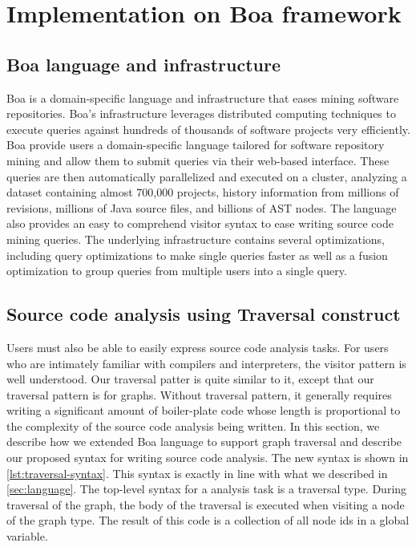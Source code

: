 \chapter{Implementation on Boa framework}
\label{sec:impl}

\section{Boa language and infrastructure}
Boa is a domain-specific language and infrastructure that eases mining software repositories. Boa's infrastructure leverages distributed computing techniques to execute queries against hundreds of thousands of software projects very efficiently. Boa provide users a
domain-specific language tailored for software repository mining and allow them to submit queries via
their web-based interface. These queries are then automatically parallelized and executed on a cluster,
analyzing a dataset containing almost 700,000 projects, history information from millions of revisions,
millions of Java source files, and billions of AST nodes. The language also provides an easy to comprehend
visitor syntax to ease writing source code mining queries. The underlying infrastructure contains
several optimizations, including query optimizations to make single queries faster as well as a fusion
optimization to group queries from multiple users into a single query. 

\section{Source code analysis using Traversal construct}
Users must also be able to easily express source code analysis tasks. For users who are intimately
familiar with compilers and interpreters, the visitor pattern is well understood. Our traversal patter is quite similar to it, except that our traversal pattern is for graphs. Without traversal pattern, it generally requires writing a
significant amount of boiler-plate code whose length is proportional to the complexity of the source code analysis being written.
In this section, we describe how we extended Boa language to support graph traversal and describe our proposed syntax for writing source code analysis. 
The new syntax is shown in \ref{lst:traversal-syntax}. This syntax is exactly in line with what we described in \ref{sec:language}. The top-level syntax for a analysis task is a traversal type. During traversal of the graph, the body of the traversal is executed when visiting a node of the graph type. The result of this code is a collection of all node ids in a global variable.

